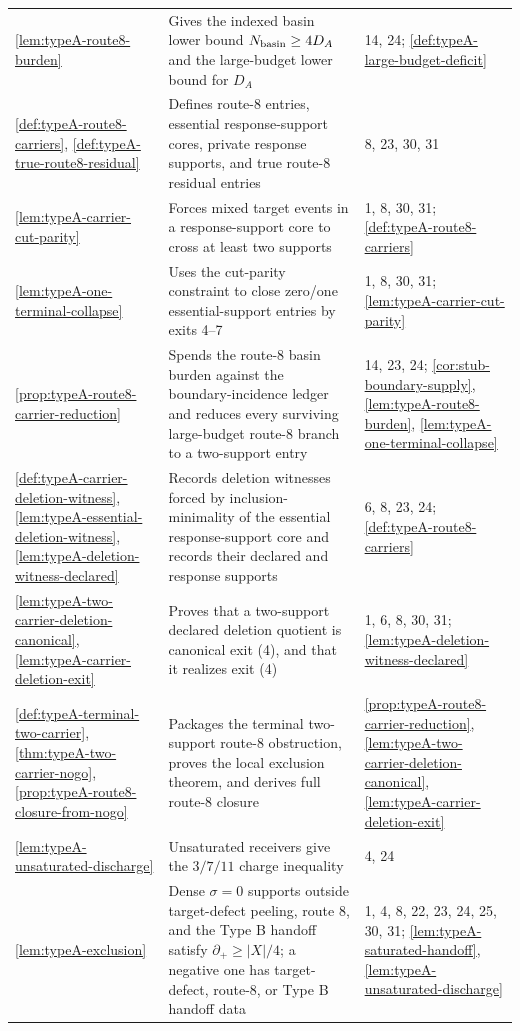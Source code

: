 \documentclass[11pt]{article}
\newcommand{\defp}{\partial_+}
\begin{document}
{\begin{longtable}{L{0.31\textwidth} L{0.42\textwidth} L{0.17\textwidth}}
\cref{lem:typeA-route8-burden} & Gives the indexed basin lower bound \(N_{\rm basin}\ge4D_A\) and the large-budget lower bound for \(D_A\) & 14, 24; \cref{def:typeA-large-budget-deficit} \\
\cref{def:typeA-route8-carriers}, \cref{def:typeA-true-route8-residual} & Defines route-8 entries, essential response-support cores, private response supports, and true route-8 residual entries & 8, 23, 30, 31 \\
\cref{lem:typeA-carrier-cut-parity} & Forces mixed target events in a response-support core to cross at least two supports & 1, 8, 30, 31; \cref{def:typeA-route8-carriers} \\
\cref{lem:typeA-one-terminal-collapse} & Uses the cut-parity constraint to close zero/one essential-support entries by exits 4--7 & 1, 8, 30, 31; \cref{lem:typeA-carrier-cut-parity} \\
\cref{prop:typeA-route8-carrier-reduction} & Spends the route-8 basin burden against the boundary-incidence ledger and reduces every surviving large-budget route-8 branch to a two-support entry & 14, 23, 24; \cref{cor:stub-boundary-supply}, \cref{lem:typeA-route8-burden}, \cref{lem:typeA-one-terminal-collapse} \\
\cref{def:typeA-carrier-deletion-witness}, \cref{lem:typeA-essential-deletion-witness}, \cref{lem:typeA-deletion-witness-declared} & Records deletion witnesses forced by inclusion-minimality of the essential response-support core and records their declared and response supports & 6, 8, 23, 24; \cref{def:typeA-route8-carriers} \\
\cref{lem:typeA-two-carrier-deletion-canonical}, \cref{lem:typeA-carrier-deletion-exit} & Proves that a two-support declared deletion quotient is canonical exit (4), and that it realizes exit (4) & 1, 6, 8, 30, 31; \cref{lem:typeA-deletion-witness-declared} \\
\cref{def:typeA-terminal-two-carrier}, \cref{thm:typeA-two-carrier-nogo}, \cref{prop:typeA-route8-closure-from-nogo} & Packages the terminal two-support route-8 obstruction, proves the local exclusion theorem, and derives full route-8 closure & \cref{prop:typeA-route8-carrier-reduction}, \cref{lem:typeA-two-carrier-deletion-canonical}, \cref{lem:typeA-carrier-deletion-exit} \\
\cref{lem:typeA-unsaturated-discharge} & Unsaturated receivers give the $3/7/11$ charge inequality & 4, 24 \\
\cref{lem:typeA-exclusion} & Dense $\sigma=0$ supports outside target-defect peeling, route 8, and the Type B handoff satisfy $\defp\ge|X|/4$; a negative one has target-defect, route-8, or Type B handoff data & 1, 4, 8, 22, 23, 24, 25, 30, 31; \cref{lem:typeA-saturated-handoff}, \cref{lem:typeA-unsaturated-discharge} \\

\end{longtable}}
\end{document}
